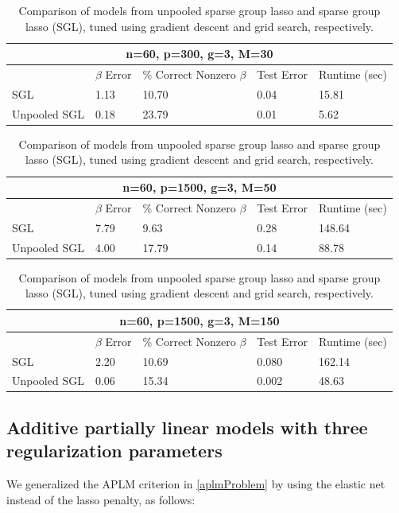 \documentclass[10pt,letterpaper]{article}
\begin{document}
\begin{table}
\begin{center}
\begin{tabular}{| l | l | l | l | l | }
\hline
\multicolumn{5}{|c|}{n=60, p=300, g=3, M=30}\\
\hline
 & $\beta$ Error & \% Correct Nonzero $\beta$ & Test Error & Runtime (sec) \\
\hline
SGL & 1.13 & 10.70 & 0.04 & 15.81 \\
\hline
Unpooled SGL & 0.18 & 23.79 & 0.01 & 5.62 \\
\hline
\end{tabular}

\begin{tabular}{| l | l | l | l | l | }
\hline
\multicolumn{5}{|c|}{n=60, p=1500, g=3, M=50}\\
\hline
 & $\beta$ Error & \% Correct Nonzero $\beta$ & Test Error & Runtime (sec) \\
\hline
SGL & 7.79 & 9.63 & 0.28 & 148.64 \\
\hline
Unpooled SGL & 4.00 & 17.79 & 0.14 & 88.78 \\
\hline
\end{tabular}

\begin{tabular}{| l | l | l | l | l | }
\hline
\multicolumn{5}{|c|}{n=60, p=1500, g=3, M=150}\\
\hline
 & $\beta$ Error & \% Correct Nonzero $\beta$ & Test Error & Runtime (sec) \\
\hline
SGL & 2.20 & 10.69 & 0.080 & 162.14 \\
\hline
Unpooled SGL & 0.06 & 15.34 & 0.002 & 48.63 \\
\hline
\end{tabular}
\end{center}
\caption {Comparison of models from unpooled sparse group lasso and sparse group lasso (SGL), tuned using gradient descent and grid search, respectively.}
\label{table:unpooled}
\end{table}

\subsection{Additive partially linear models with three regularization parameters}
We generalized the APLM criterion in \eqref{aplmProblem} by using the elastic net instead of the lasso penalty, as follows:
\end{document}
